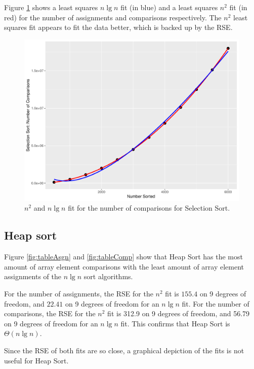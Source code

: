 \documentclass[10pt,fleqn]{article}
\begin{document}
Figure \ref{fig:select-plot-comp} shows a least squares $n \lg n$ fit (in blue) and a least squares $n^2$ fit (in red) for the number of assignments and comparisons respectively. The $n^2$ least squares fit appears to fit the data better, which is backed up by the RSE.

\begin{figure}[h]
    \centering
    \includegraphics[scale=0.3]{CoSc 320 Sort Paper Template/select-plot-comp.pdf}
    \caption{$n^2$ and $n\lg n$ fit for the number of comparisons for Selection Sort.}
    \label{fig:select-plot-comp}
\end{figure}

\subsection{Heap sort}

Figure \ref{fig:tableAsgn} and \ref{fig:tableComp} show that Heap Sort has the most amount of array element comparisons with the least amount of array element assignments of the $n\lg n$ sort algorithms.

For the number of assignments, the RSE for the $n^2$ fit is $155.4$ on 9 degrees of freedom, and $22.41$ on 9 degrees of freedom for an $n\lg n$ fit. For the number of comparisons, the RSE for the $n^2$ fit is 312.9 on 9 degrees of freedom, and 56.79 on 9 degrees of freedom for an $n \lg n$ fit. This confirms that Heap Sort is $\Theta(n\lg n)$.

Since the RSE of both fits are so close, a graphical depiction of the fits is not useful for Heap Sort.
\end{document}
